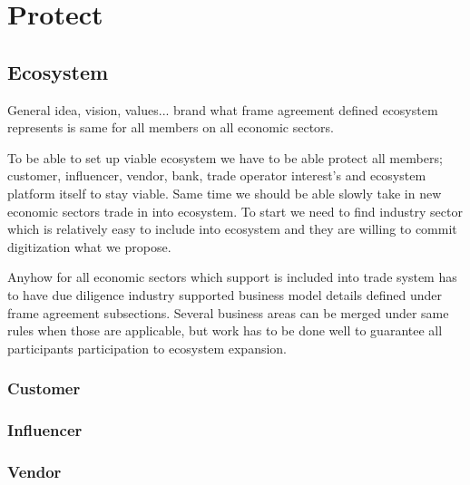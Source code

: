 %
%
%
\part{Protect}
\label{protect}
\chapter{Ecosystem}
General idea, vision, values... brand what frame agreement defined ecosystem
represents is same for all members on all economic sectors.

To be able to set up viable ecosystem we have to be able protect all members;
customer, influencer, vendor, bank, trade operator interest's and ecosystem
platform itself to stay viable. Same time we should be able slowly take in new
economic sectors trade in into ecosystem. To start we need to find industry
sector which is relatively easy to include into ecosystem and they are willing
to commit digitization what we propose.

Anyhow for all economic sectors which support is included into trade system
has to have due diligence industry supported business model details defined
under frame agreement subsections. Several business areas can be merged under
same rules when those are applicable, but work has to be done well to
guarantee all participants participation to ecosystem expansion.

\section{Customer}
\label{protect_customer}

\section{Influencer}
\label{protect_influencer}

\section{Vendor}
\label{protect_vendor}

